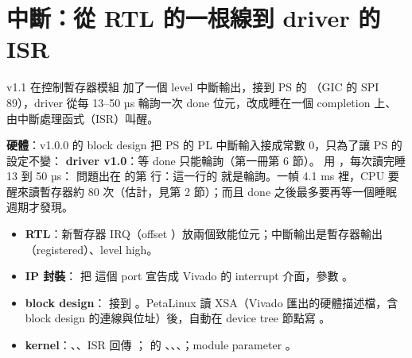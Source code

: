 \section{中斷：從 RTL 的一根線到 driver 的 ISR}
\label{sec:irq}

\begin{oneline}
v1.1 在控制暫存器模組  加了一個 level 中斷輸出，接到 PS 的 （GIC 的 SPI 89），driver 從每 13--50 µs 輪詢一次 done 位元，改成睡在一個 completion 上、由中斷處理函式（ISR）叫醒。
\end{oneline}

\begin{before}
\textbf{硬體}：v1.0.0 的 block design 把 PS 的 PL 中斷輸入接成常數 0，只為了讓 PS 的設定不變：
\textbf{driver v1.0}：等 done 只能輪詢（第一冊第 6 節）。 用 ，每次讀完睡 13 到 50 µs：
問題出在  的第  行：這一行的  就是輪詢。一幀 4.1 ms 裡，CPU 要醒來讀暫存器約 80 次（估計，見第 2 節）；而且 done 之後最多要再等一個睡眠週期才發現。
\end{before}

\begin{tech}
\begin{itemize}
\item \textbf{RTL}：新暫存器 IRQ（offset ）放兩個致能位元；中斷輸出是暫存器輸出（registered）、level high。
\item \textbf{IP 封裝}： 把  這個 port 宣告成 Vivado 的 interrupt 介面，參數 。
\item \textbf{block design}： 接到 。PetaLinux 讀 XSA（Vivado 匯出的硬體描述檔，含 block design 的連線與位址）後，自動在 device tree 節點寫 。
\item \textbf{kernel}：、、ISR 回傳 ； 的 、、、；module parameter 。
\end{itemize}
\end{tech}

